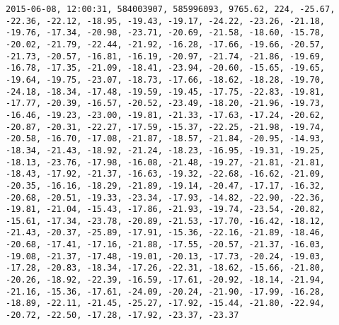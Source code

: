 \begin{lstlisting}
2015-06-08, 12:00:31, 584003907, 585996093, 9765.62, 224, -25.67, -22.36, -22.12, -18.95, -19.43, -19.17, -24.22, -23.26, -21.18, -19.76, -17.34, -20.98, -23.71, -20.69, -21.58, -18.60, -15.78, -20.02, -21.79, -22.44, -21.92, -16.28, -17.66, -19.66, -20.57, -21.73, -20.57, -16.81, -16.19, -20.97, -21.74, -21.86, -19.69, -16.78, -17.35, -21.09, -18.41, -23.94, -20.60, -15.65, -19.65, -19.64, -19.75, -23.07, -18.73, -17.66, -18.62, -18.28, -19.70, -24.18, -18.34, -17.48, -19.59, -19.45, -17.75, -22.83, -19.81, -17.77, -20.39, -16.57, -20.52, -23.49, -18.20, -21.96, -19.73, -16.46, -19.23, -23.00, -19.81, -21.33, -17.63, -17.24, -20.62, -20.87, -20.31, -22.27, -17.59, -15.37, -22.25, -21.98, -19.74, -20.58, -16.70, -17.08, -21.87, -18.57, -21.84, -20.95, -14.93, -18.34, -21.43, -18.92, -21.24, -18.23, -16.95, -19.31, -19.25, -18.13, -23.76, -17.98, -16.08, -21.48, -19.27, -21.81, -21.81, -18.43, -17.92, -21.37, -16.63, -19.32, -22.68, -16.62, -21.09, -20.35, -16.16, -18.29, -21.89, -19.14, -20.47, -17.17, -16.32, -20.68, -20.51, -19.33, -23.34, -17.93, -14.82, -22.90, -22.36, -19.81, -21.04, -15.43, -17.86, -21.93, -19.74, -23.54, -20.82, -15.61, -17.34, -23.78, -20.89, -21.53, -17.70, -16.42, -18.12, -21.43, -20.37, -25.89, -17.91, -15.36, -22.16, -21.89, -18.46, -20.68, -17.41, -17.16, -21.88, -17.55, -20.57, -21.37, -16.03, -19.08, -21.37, -17.48, -19.01, -20.13, -17.73, -20.24, -19.03, -17.28, -20.83, -18.34, -17.26, -22.31, -18.62, -15.66, -21.80, -20.26, -18.92, -22.39, -16.59, -17.61, -20.92, -18.14, -21.94, -21.16, -15.36, -17.61, -24.09, -20.24, -21.90, -17.99, -16.28, -18.89, -22.11, -21.45, -25.27, -17.92, -15.44, -21.80, -22.94, -20.72, -22.50, -17.28, -17.92, -23.37, -23.37

\end{lstlisting}
